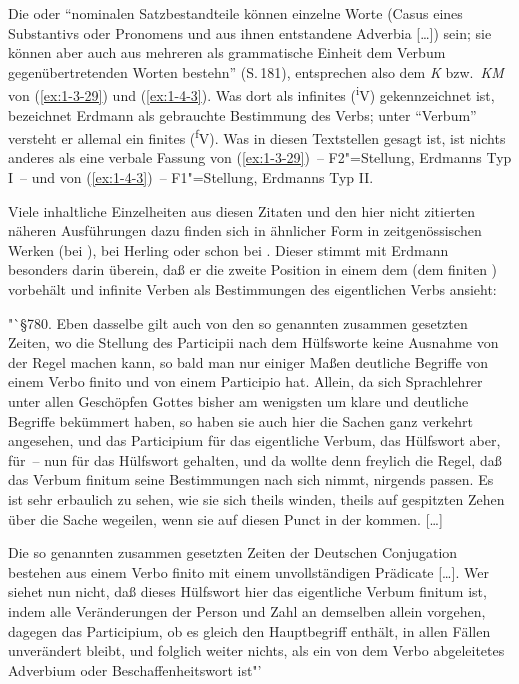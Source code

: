 \documentclass[output=paper]{langsci/langscibook}
\begin{document}
Die  oder "`nominalen Satzbestandteile können einzelne
Worte (Casus eines Substantivs oder Pronomens und aus ihnen
entstandene Adverbia [\ldots]) sein; sie können aber auch aus mehreren als
grammatische Einheit dem Verbum gegenübertretenden Worten bestehn"'
(S.\,181), entsprechen also dem \textit{K} bzw.\ \textit{KM} von
(\ref{ex:1-3-29}) und (\ref{ex:1-4-3}). Was dort als infinites 
(\textsuperscript{i}V) gekennzeichnet ist, bezeichnet Erdmann als
 gebrauchte Bestimmung des Verbs; unter "`Verbum"' versteht er
allemal ein finites  (\textsuperscript{f}V). Was in diesen
Textstellen gesagt ist, ist nichts anderes als eine verbale Fassung
von (\ref{ex:1-3-29})~-- F2"=Stellung, Erdmanns Typ I~-- und von
(\ref{ex:1-4-3})~-- F1"=Stellung, Erdmanns Typ II.

\ssubsection{}%
\label{subsec:1-5.2}
Viele inhaltliche Einzelheiten aus diesen Zitaten und den hier nicht zitierten
näheren Ausführungen dazu finden sich in ähnlicher Form in zeitgenössischen Werken (\zb bei
\citet{Sanders1883}), bei Herling \citeyearpar{Herling1821T,Herling1828,Herling1830} oder schon bei \citet{Adelung1782}. Dieser stimmt mit Erdmann besonders darin überein, daß er die zweite Position in einem  dem  (\dash dem finiten ) vorbehält und infinite Verben als Bestimmungen des eigentlichen Verbs ansieht:
\begin{exe}
\ex\label{ex:1-5-2}
"`§780. Eben dasselbe gilt auch von den so genannten zusammen gesetzten
Zeiten, wo die Stellung des Participii nach dem Hülfsworte keine Ausnahme von der Regel machen kann, so bald man nur einiger Maßen deutliche
Begriffe von einem Verbo finito und von einem Participio hat. Allein, da
sich Sprachlehrer unter allen Geschöpfen Gottes bisher am wenigsten um
klare und deutliche Begriffe bekümmert haben, so haben sie auch hier die
Sachen ganz verkehrt angesehen, und das Participium für das eigentliche
Verbum, das Hülfswort aber, für~-- nun für das Hülfswort gehalten, und da
wollte denn freylich die Regel, daß das Verbum finitum seine Bestimmungen nach sich nimmt, nirgends passen. Es ist sehr erbaulich zu sehen, wie
sie sich theils winden, theils auf gespitzten Zehen über die Sache wegeilen,
wenn sie auf diesen Punct in der  kommen. [\ldots]

\hspace{1em} Die so genannten zusammen gesetzten Zeiten der Deutschen Conjugation
bestehen aus einem Verbo finito mit einem unvollständigen Prädicate
[\ldots]. Wer siehet nun nicht, daß dieses Hülfswort hier das eigentliche
Verbum finitum ist, indem alle Veränderungen der Person und Zahl an
demselben allein vorgehen, dagegen das Participium, ob es gleich den
Hauptbegriff enthält, in allen Fällen unverändert bleibt, und folglich
weiter nichts, als ein von dem Verbo abgeleitetes Adverbium oder
Beschaffenheitswort ist"' \citep[525f]{Adelung1782}
\end{exe}
\end{document}
